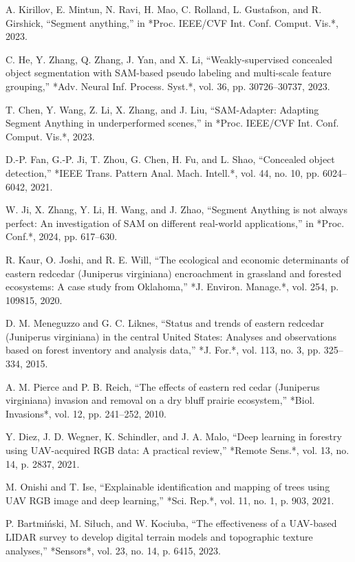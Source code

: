 \documentclass[letterpaper, 10 pt, conference]{ieeeconf}  %
\begin{document}
\begin{thebibliography}{99}

 A. Kirillov, E. Mintun, N. Ravi, H. Mao, C. Rolland, L. Gustafson, and R. Girshick, ``Segment anything,'' in *Proc. IEEE/CVF Int. Conf. Comput. Vis.*, 2023.

 C. He, Y. Zhang, Q. Zhang, J. Yan, and X. Li, ``Weakly-supervised concealed object segmentation with SAM-based pseudo labeling and multi-scale feature grouping,'' *Adv. Neural Inf. Process. Syst.*, vol. 36, pp. 30726–30737, 2023.

 T. Chen, Y. Wang, Z. Li, X. Zhang, and J. Liu, ``SAM-Adapter: Adapting Segment Anything in underperformed scenes,'' in *Proc. IEEE/CVF Int. Conf. Comput. Vis.*, 2023.

 D.-P. Fan, G.-P. Ji, T. Zhou, G. Chen, H. Fu, and L. Shao, ``Concealed object detection,'' *IEEE Trans. Pattern Anal. Mach. Intell.*, vol. 44, no. 10, pp. 6024–6042, 2021.

 W. Ji, X. Zhang, Y. Li, H. Wang, and J. Zhao, ``Segment Anything is not always perfect: An investigation of SAM on different real-world applications,'' in *Proc. Conf.*, 2024, pp. 617–630.

 R. Kaur, O. Joshi, and R. E. Will, ``The ecological and economic determinants of eastern redcedar (Juniperus virginiana) encroachment in grassland and forested ecosystems: A case study from Oklahoma,'' *J. Environ. Manage.*, vol. 254, p. 109815, 2020.

 D. M. Meneguzzo and G. C. Liknes, ``Status and trends of eastern redcedar (Juniperus virginiana) in the central United States: Analyses and observations based on forest inventory and analysis data,'' *J. For.*, vol. 113, no. 3, pp. 325–334, 2015.

 A. M. Pierce and P. B. Reich, ``The effects of eastern red cedar (Juniperus virginiana) invasion and removal on a dry bluff prairie ecosystem,'' *Biol. Invasions*, vol. 12, pp. 241–252, 2010.

 Y. Diez, J. D. Wegner, K. Schindler, and J. A. Malo, ``Deep learning in forestry using UAV-acquired RGB data: A practical review,'' *Remote Sens.*, vol. 13, no. 14, p. 2837, 2021.

 M. Onishi and T. Ise, ``Explainable identification and mapping of trees using UAV RGB image and deep learning,'' *Sci. Rep.*, vol. 11, no. 1, p. 903, 2021.

 P. Bartmiński, M. Siłuch, and W. Kociuba, ``The effectiveness of a UAV-based LIDAR survey to develop digital terrain models and topographic texture analyses,'' *Sensors*, vol. 23, no. 14, p. 6415, 2023.


\end{thebibliography}
\end{document}
